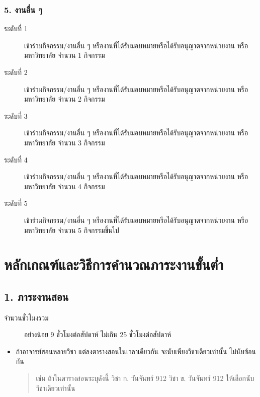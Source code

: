 \documentclass[a4paper,12pt,english]{sphinxmanual}
\begin{document}
\subsection{5. งานอื่น ๆ}
\label{\detokenize{submission_part1:id19}}\begin{description}
\item[{ระดับที่ 1}] \leavevmode
เข้าร่วมกิจกรรม/งานอื่น ๆ หรืองานที่ได้รับมอบหมายหรือได้รับอนุญาตจากหน่วยงาน หรือมหาวิทยาลัย จำนวน 1 กิจกรรม

\item[{ระดับที่ 2}] \leavevmode
เข้าร่วมกิจกรรม/งานอื่น ๆ หรืองานที่ได้รับมอบหมายหรือได้รับอนุญาตจากหน่วยงาน หรือมหาวิทยาลัย จำนวน 2 กิจกรรม

\item[{ระดับที่ 3}] \leavevmode
เข้าร่วมกิจกรรม/งานอื่น ๆ หรืองานที่ได้รับมอบหมายหรือได้รับอนุญาตจากหน่วยงาน หรือมหาวิทยาลัย จำนวน 3 กิจกรรม

\item[{ระดับที่ 4}] \leavevmode
เข้าร่วมกิจกรรม/งานอื่น ๆ หรืองานที่ได้รับมอบหมายหรือได้รับอนุญาตจากหน่วยงาน หรือมหาวิทยาลัย จำนวน 4 กิจกรรม

\item[{ระดับที่ 5}] \leavevmode
เข้าร่วมกิจกรรม/งานอื่น ๆ หรืองานที่ได้รับมอบหมายหรือได้รับอนุญาตจากหน่วยงาน หรือมหาวิทยาลัย จำนวน 5 กิจกรรมขึ้นไป

\end{description}


\chapter{หลักเกณฑ์และวิธีการคำนวณภาระงานขั้นต่ำ}
\label{\detokenize{workload_rubric:id1}}\label{\detokenize{workload_rubric::doc}}

\section{1. ภาระงานสอน}
\label{\detokenize{workload_rubric:id2}}\begin{description}
\item[{จำนวนชั่วโมงรวม}] \leavevmode
อย่างน้อย 9 ชั่วโมงต่อสัปดาห์ ไม่เกิน 25 ชั่วโมงต่อสัปดาห์

\end{description}
\begin{itemize}
\item {} 
ถ้าอาจารย์สอนหลายวิชา แต่ลงตารางสอนในเวลาเดียวกัน จะนับเพียงวิชาเดียวเท่านั้น ไม่นับซ้อนกัน
\begin{quote}

เช่น ถ้าในตารางสอนระบุดังนี้
วิชา ก. วันจันทร์ 9\sphinxhyphen{}12
วิชา ข. วันจันทร์ 9\sphinxhyphen{}12
ให้เลือกนับวิชาเดียวเท่านั้น
\end{quote}

\end{itemize}
\end{document}
